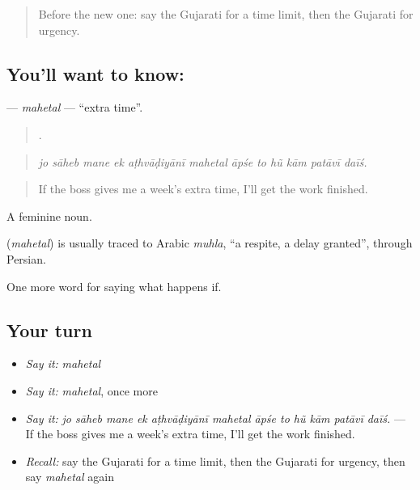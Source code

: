 \label{lesson:GU-C530-mahetal}



\begin{quote}
Before the new one: say the Gujarati for a time limit, then the Gujarati for urgency.
\end{quote}

\subsection*{You'll want to know: }
\textbf{} — \emph{mahetal} — \textquotedblleft{}extra time\textquotedblright{}.

\begin{quote}
           .
\end{quote}

\begin{quote}
\emph{jo sāheb mane ek aṭhvāḍiyānī mahetal āpśe to hũ kām patāvī daīś.}
\end{quote}

\begin{quote}
If the boss gives me a week's extra time, I'll get the work finished.
\end{quote}

A feminine noun.

\begin{cousinweb}
\textbf{} (\emph{mahetal}) is usually traced to Arabic \emph{muhla}, \textquotedblleft{}a respite, a delay granted\textquotedblright{}, through Persian.
\end{cousinweb}

\begin{grammarlens}[title={What you've built}]
One more word for saying what happens if.
\end{grammarlens}

\subsection*{Your turn}
\begin{itemize}
\raggedright
  \item \emph{Say it:} \emph{mahetal}
  \item \emph{Say it:} \emph{mahetal}, once more
  \item \emph{Say it:} \emph{jo sāheb mane ek aṭhvāḍiyānī mahetal āpśe to hũ kām patāvī daīś.} — If the boss gives me a week's extra time, I'll get the work finished.
  \item \emph{Recall:} say the Gujarati for a time limit, then the Gujarati for urgency, then say \emph{mahetal} again
\end{itemize}

